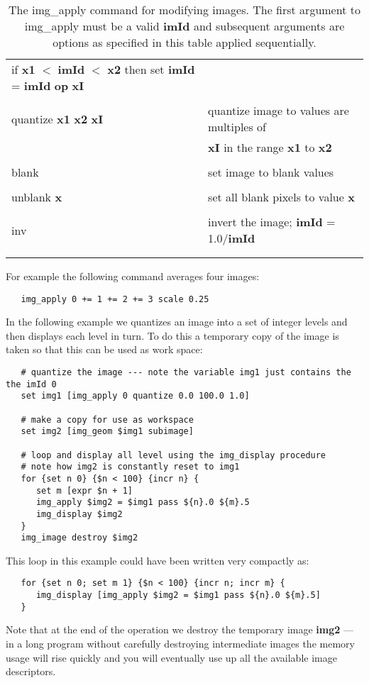 \begin{table}
\begin{tabular}{|l||l|}
\begin{minipage}[t]{11.0cm}
if {\bf x1} $<$ {\bf imId} $<$ {\bf x2}  then set {\bf imId} = {\bf imId} {\bf op } {\bf xI} 
\end{minipage} \\
& \\
quantize {\bf x1} {\bf x2} {\bf xI} & quantize image to values are multiples of\\
& {\bf xI} in the range {\bf x1} to {\bf x2}\\
& \\
blank & set image to blank values\\
& \\
unblank {\bf x} & set all blank pixels to value {\bf x}\\
& \\
inv & invert the image; {\bf imId} = 1.0/{\bf imId}\\
& \\
& \\ \hline
\end{tabular}
\caption{The img\_apply command for modifying
images.  The first argument to
img\_apply must be a valid {\bf imId} and subsequent arguments are options
as specified in this table applied sequentially.}
\end{table}

For example the following command averages four images:
\begin{verbatim}
   img_apply 0 += 1 += 2 += 3 scale 0.25
\end{verbatim}

In the following example we quantizes an image into a set of integer levels
and then displays each level in turn.  To do this a temporary copy of the
image is taken so that this can be used as work space:
\begin{verbatim}
   # quantize the image --- note the variable img1 just contains the the imId 0
   set img1 [img_apply 0 quantize 0.0 100.0 1.0]

   # make a copy for use as workspace
   set img2 [img_geom $img1 subimage]

   # loop and display all level using the img_display procedure
   # note how img2 is constantly reset to img1
   for {set n 0} {$n < 100} {incr n} {
      set m [expr $n + 1]
      img_apply $img2 = $img1 pass ${n}.0 ${m}.5
      img_display $img2
   }
   img_image destroy $img2
\end{verbatim}
This loop in this example could have been written very compactly as:
\begin{verbatim}
   for {set n 0; set m 1} {$n < 100} {incr n; incr m} {
      img_display [img_apply $img2 = $img1 pass ${n}.0 ${m}.5]
   }
\end{verbatim}
Note that at the end of the operation we destroy the temporary image
{\bf img2} --- in a long program without carefully destroying intermediate
images the memory usage will rise quickly and you will eventually use up all
the available image descriptors.

